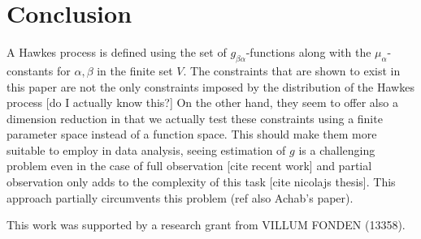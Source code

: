 \documentclass[accepted]{uai2021} %
\begin{document}
\section{Conclusion}

A Hawkes process is defined using the set of $g_{\beta\alpha}$-functions along 
with the $\mu_\alpha$-constants for $\alpha,\beta$ in the finite set $V$. The 
constraints that are shown to exist in this paper are not the only constraints 
imposed by the distribution of the Hawkes process [do I actually know this?] On 
the other hand, they seem to offer also a dimension reduction in that we 
actually test these constraints using a finite parameter space instead of a 
function space. This should make them more suitable to employ in data analysis, 
seeing estimation of $g$ is a challenging problem even in the case of full 
observation [cite recent work] and partial observation only adds to the 
complexity of this task [cite nicolajs thesis]. This approach partially 
circumvents this problem (ref also Achab's paper).




\begin{contributions} %

\end{contributions}

\begin{acknowledgements} %
    This work was supported by a research grant from
    VILLUM FONDEN (13358).
\end{acknowledgements}


\end{document}
